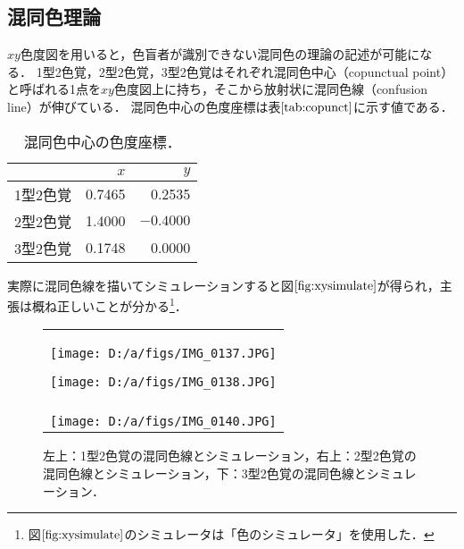 \documentclass[uplatex,paper=a4,fontsize=4.0truemm,jafontsize=4.0truemm,head_space=30.0truemm,foot_space=30.0truemm,baselineskip=8.0truemm,line_length=40zw,gutter=25.0truemm,oneside,openany,fleqn,hanging_panctuation,open_bracket_pos=nibu_tentsuki,dvipdfmx,jis2004,book,titlepage]{jlreq}
\theoremstyle{mystyle}
\newcommand{\captiondot}[1]{\caption{#1．}}
\newcommand{\tableinput}[4]{\begin{table}[tbp]\centering\captiondot{#3}\label{tab:#4}\begin{tabular}{#1}#2\end{tabular}\end{table}}
\newcommand{\mathdisplaystyle}[1]{\(\displaystyle{#1}\)}
\newcommand{\Reference}[1]{\mathdisplaystyle{\ref{#1}}}
\newcommand{\negativevalue}[1]{{-#1}}
\begin{document}
			\subsection{混同色理論}
				\mathdisplaystyle{xy}色度図を用いると，色盲者が識別できない混同色の理論の記述が可能になる．
				1型2色覚，2型2色覚，3型2色覚はそれぞれ混同色中心（copunctual point）と呼ばれる1点を\mathdisplaystyle{xy}色度図上に持ち，そこから放射状に混同色線（confusion line）が伸びている．
				混同色中心の色度座標は表\Reference{tab:copunct}に示す値である\cite[Table 1]{Fomins2011}．
				\tableinput{l|rr}{ & \(x\) & \(y\) \\ \hline
					1型2色覚 & 0.7465 & 0.2535 \\
					2型2色覚 & 1.4000 & \mathdisplaystyle{\negativevalue{0.4000}} \\
					3型2色覚 & 0.1748 & 0.0000}{混同色中心の色度座標}{copunct}
				実際に混同色線を描いてシミュレーションすると図\Reference{fig:xysimulate}が得られ，主張は概ね正しいことが分かる\footnote{図\Reference{fig:xysimulate}のシミュレータは「色のシミュレータ」を使用した．}．
				\begin{figure}[tbp]
					\centering
					\begin{tabular}{c}
						\begin{minipage}{0.5\linewidth}
							\centering
							\texttt{[image: D:/a/figs/IMG\_0137.JPG]}
						\end{minipage}
						\begin{minipage}{0.5\linewidth}
							\centering
							\texttt{[image: D:/a/figs/IMG\_0138.JPG]}
						\end{minipage} \\
						\begin{minipage}{0.06\linewidth}
							\vspace{10truemm}
						\end{minipage} \\
						\begin{minipage}{0.5\linewidth}
							\centering
							\texttt{[image: D:/a/figs/IMG\_0140.JPG]}
						\end{minipage}
						\begin{minipage}{0.5\linewidth}
							\vspace{10truemm}
						\end{minipage}
					\end{tabular}
					\captiondot{左上：1型2色覚の混同色線とシミュレーション，右上：2型2色覚の混同色線とシミュレーション，下：3型2色覚の混同色線とシミュレーション}\label{fig:xysimulate}
				\end{figure}
\end{document}
